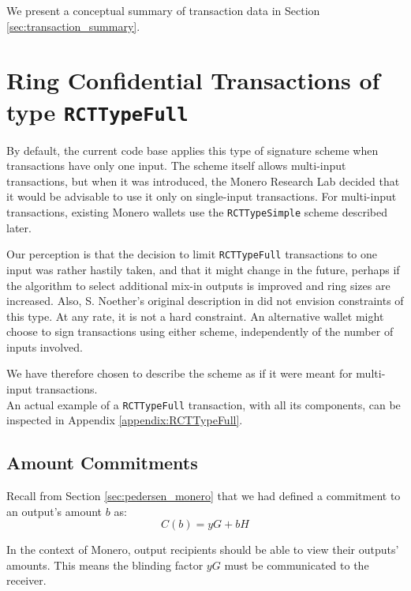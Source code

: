We present a conceptual summary of transaction data in Section \ref{sec:transaction_summary}.


\section{Ring Confidential Transactions of type {\tt RCTTypeFull}}
\label{sec:RCTTypeFull}

By default, the current code base applies this type of signature scheme when transactions have only one input. The scheme itself allows multi-input transactions, but when it was introduced, the Monero Research Lab decided that it would be advisable to use it only on single-input transactions. For multi-input transactions, existing Monero wallets use the {\tt RCTTypeSimple} scheme described later.

Our perception is that the decision to limit {\tt RCTTypeFull} transactions to one input was rather hastily taken, and that it might change in the future, perhaps if the algorithm to select additional mix-in outputs is improved and ring sizes are increased. Also, S. Noether’s original description in \cite{ledger34} did not envision constraints of this type. At any rate, it is not a hard constraint. An alternative wallet might choose to sign transactions using either scheme, independently of the number of inputs involved.

We have therefore chosen to describe the scheme as if it were meant for multi-input transactions.
\\

An actual example of a {\tt RCTTypeFull} transaction, with all its components, can be inspected in Appendix \ref{appendix:RCTTypeFull}.


\subsection{Amount Commitments}
\label{amount-commitments}
Recall from Section \ref{sec:pedersen_monero} that we had defined a commitment to an output’s amount $b$ as: 
\[C(b) = y G + b H\]

In the context of Monero, output recipients should be able to view their outputs’ amounts. This means the blinding factor $y G$ must be communicated to the receiver.


